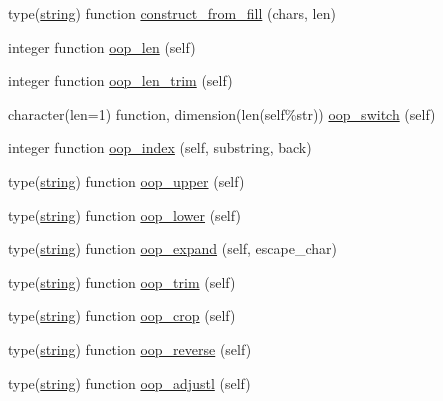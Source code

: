 \begin{DoxyCompactItemize}
\item 
type(\mbox{\hyperlink{structm__strings__oop_1_1string}{string}}) function \mbox{\hyperlink{namespacem__strings__oop_a411874cce2f16fee4d05d7528b510703}{construct\+\_\+from\+\_\+fill}} (chars, len)
\item 
integer function \mbox{\hyperlink{namespacem__strings__oop_a768ea13372aadbeae760c72d0b2a1939}{oop\+\_\+len}} (self)
\item 
integer function \mbox{\hyperlink{namespacem__strings__oop_a1b9bf3c6aac71ce1782fb3116ffb63f8}{oop\+\_\+len\+\_\+trim}} (self)
\item 
character(len=1) function, dimension(len(self\%str)) \mbox{\hyperlink{namespacem__strings__oop_a31be80e67fa4829b5ac48c530bd58b7b}{oop\+\_\+switch}} (self)
\item 
integer function \mbox{\hyperlink{namespacem__strings__oop_aafe02b26ccba21eb8a35e9fa99d6c790}{oop\+\_\+index}} (self, substring, back)
\item 
type(\mbox{\hyperlink{structm__strings__oop_1_1string}{string}}) function \mbox{\hyperlink{namespacem__strings__oop_a9f4030a1ab2c7e2aa71b9d1f2754e67e}{oop\+\_\+upper}} (self)
\item 
type(\mbox{\hyperlink{structm__strings__oop_1_1string}{string}}) function \mbox{\hyperlink{namespacem__strings__oop_ad49fed83544ede7b94948dee326ca3d7}{oop\+\_\+lower}} (self)
\item 
type(\mbox{\hyperlink{structm__strings__oop_1_1string}{string}}) function \mbox{\hyperlink{namespacem__strings__oop_a5b96d2a6f242a096cd5788cf0802e825}{oop\+\_\+expand}} (self, escape\+\_\+char)
\item 
type(\mbox{\hyperlink{structm__strings__oop_1_1string}{string}}) function \mbox{\hyperlink{namespacem__strings__oop_ab9238801d6c3af2fe7ee81c8d2c514ff}{oop\+\_\+trim}} (self)
\item 
type(\mbox{\hyperlink{structm__strings__oop_1_1string}{string}}) function \mbox{\hyperlink{namespacem__strings__oop_aa1a395d359592720a842054fd0aaff0a}{oop\+\_\+crop}} (self)
\item 
type(\mbox{\hyperlink{structm__strings__oop_1_1string}{string}}) function \mbox{\hyperlink{namespacem__strings__oop_ac3ab62e14d0b8445f51e084b810e2f76}{oop\+\_\+reverse}} (self)
\item 
type(\mbox{\hyperlink{structm__strings__oop_1_1string}{string}}) function \mbox{\hyperlink{namespacem__strings__oop_a8e2457b4a1c4489e9600e340fa9ce533}{oop\+\_\+adjustl}} (self)

\end{DoxyCompactItemize}

